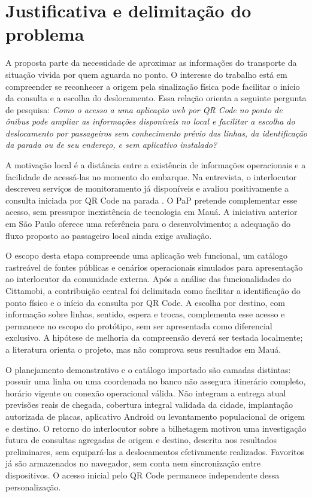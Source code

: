 \documentclass[12pt,oneside,a4paper,brazil]{abntex2}
\begin{document}
\section{Justificativa e delimitação do problema}
A proposta parte da necessidade de aproximar as informações do transporte da situação vivida por quem aguarda no ponto. O interesse do trabalho está em compreender se reconhecer a origem pela sinalização física pode facilitar o início da consulta e a escolha do deslocamento. Essa relação orienta a seguinte pergunta de pesquisa: \textit{Como o acesso a uma aplicação web por QR Code no ponto de ônibus pode ampliar as informações disponíveis no local e facilitar a escolha do deslocamento por passageiros sem conhecimento prévio das linhas, da identificação da parada ou de seu endereço, e sem aplicativo instalado?}

A motivação local é a distância entre a existência de informações operacionais e a facilidade de acessá-las no momento do embarque. Na entrevista, o interlocutor descreveu serviços de monitoramento já disponíveis e avaliou positivamente a consulta iniciada por QR Code na parada \citep[739--853 s; 961--983 s]{entrevistaosmar2026}. O PaP pretende complementar esse acesso, sem pressupor inexistência de tecnologia em Mauá. A iniciativa anterior em São Paulo oferece uma referência para o desenvolvimento; a adequação do fluxo proposto ao passageiro local ainda exige avaliação.

O escopo desta etapa compreende uma aplicação web funcional, um catálogo rastreável de fontes públicas e cenários operacionais simulados para apresentação ao interlocutor da comunidade externa. Após a análise das funcionalidades do Cittamobi, a contribuição central foi delimitada como facilitar a identificação do ponto físico e o início da consulta por QR Code. A escolha por destino, com informação sobre linhas, sentido, espera e trocas, complementa esse acesso e permanece no escopo do protótipo, sem ser apresentada como diferencial exclusivo. A hipótese de melhoria da compreensão deverá ser testada localmente; a literatura orienta o projeto, mas não comprova seus resultados em Mauá.

O planejamento demonstrativo e o catálogo importado são camadas distintas: possuir uma linha ou uma coordenada no banco não assegura itinerário completo, horário vigente ou conexão operacional válida. Não integram a entrega atual previsões reais de chegada, cobertura integral validada da cidade, implantação autorizada de placas, aplicativo Android ou levantamento populacional de origem e destino. O retorno do interlocutor sobre a bilhetagem motivou uma investigação futura de consultas agregadas de origem e destino, descrita nos resultados preliminares, sem equipará-las a deslocamentos efetivamente realizados. Favoritos já são armazenados no navegador, sem conta nem sincronização entre dispositivos. O acesso inicial pelo QR Code permanece independente dessa personalização.
\end{document}
